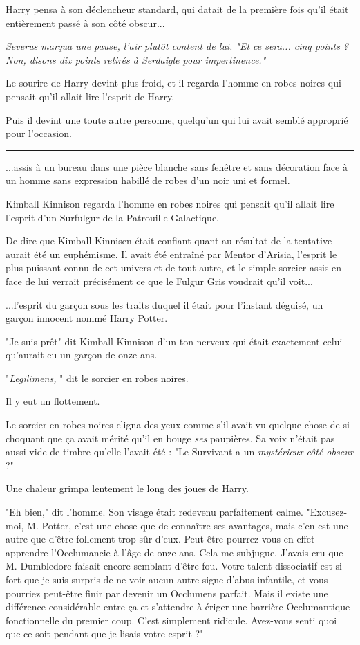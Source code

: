 Harry pensa à son déclencheur standard, qui datait de la première fois qu'il était entièrement passé à son côté obscur...

\emph{Severus marqua une pause, l'air plutôt content de lui. "Et ce sera... cinq points ? Non, disons dix points retirés à Serdaigle pour impertinence."} 

Le sourire de Harry devint plus froid, et il regarda l'homme en robes noires qui pensait qu'il allait lire l'esprit de Harry.

Puis il devint une toute autre personne, quelqu'un qui lui avait semblé approprié pour l'occasion.
\par\noindent\rule{\textwidth}{0.4pt}
...assis à un bureau dans une pièce blanche sans fenêtre et sans décoration face à un homme sans expression habillé de robes d'un noir uni et formel.

Kimball Kinnison regarda l'homme en robes noires qui pensait qu'il allait lire l'esprit d'un Surfulgur de la Patrouille Galactique.

De dire que Kimball Kinnisen était confiant quant au résultat de la tentative aurait été un euphémisme. Il avait été entraîné par Mentor d'Arisia, l'esprit le plus puissant connu de cet univers et de tout autre, et le simple sorcier assis en face de lui verrait précisément ce que le Fulgur Gris voudrait qu'il voit...

...l'esprit du garçon sous les traits duquel il était pour l'instant déguisé, un garçon innocent nommé Harry Potter.

"Je suis prêt" dit Kimball Kinnison d'un ton nerveux qui était exactement celui qu'aurait eu un garçon de onze ans.

"\emph{Legilimens,} " dit le sorcier en robes noires.

Il y eut un flottement.

Le sorcier en robes noires cligna des yeux comme s'il avait vu quelque chose de si choquant que ça avait mérité qu'il en bouge \emph{ses } paupières. Sa voix n'était pas aussi vide de timbre qu'elle l'avait été : "Le Survivant a un \emph{mystérieux}  \emph{côté obscur}  ?"

Une chaleur grimpa lentement le long des joues de Harry.

"Eh bien," dit l'homme. Son visage était redevenu parfaitement calme. "Excusez-moi, M. Potter, c'est une chose que de connaître ses avantages, mais c'en est une autre que d'être follement trop sûr d'eux. Peut-être pourrez-vous en effet apprendre l'Occlumancie à l'âge de onze ans. Cela me subjugue. J'avais cru que M. Dumbledore faisait encore semblant d'être fou. Votre talent dissociatif est si fort que je suis surpris de ne voir aucun autre signe d'abus infantile, et vous pourriez peut-être finir par devenir un Occlumens parfait. Mais il existe une différence considérable entre ça et s'attendre à ériger une barrière Occlumantique fonctionnelle du premier coup. C'est simplement ridicule. Avez-vous senti quoi que ce soit pendant que je lisais votre esprit ?"

